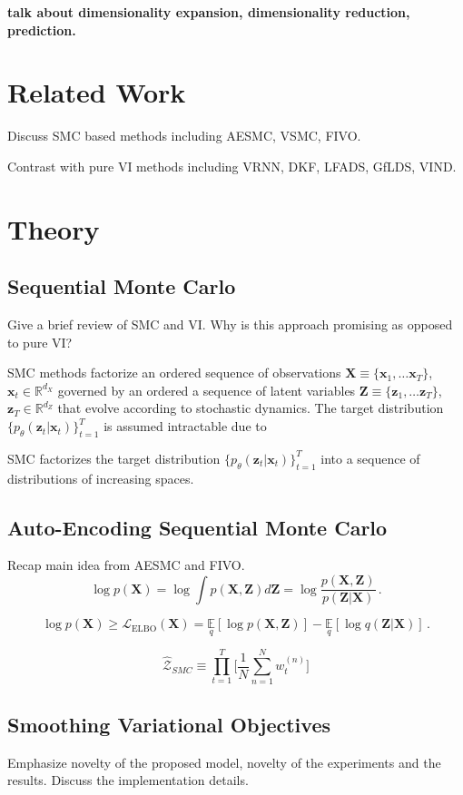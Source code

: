 \documentclass{article}
\newcommand{\be}{\begin{equation}}
\newcommand{\ee}{\end{equation}}
\newcommand{\trm}[1]{\textrm{#1}}
\newcommand{\mbf}[1]{\mathbf{#1}}
\newcommand{\mbb}[1]{\mathbb{#1}}
\newcommand{\msc}[1]{\mathscr{#1}}
\newcommand{\bx}{\mbf{x}}
\newcommand{\bX}{\mbf{X}}
\newcommand{\bZ}{\mbf{Z}}
\newcommand{\bz}{\mbf{z}}
\begin{document}
\textbf{talk about dimensionality expansion, dimensionality reduction, prediction.}

\section{Related Work}
Discuss SMC based methods including AESMC, VSMC, FIVO. 

Contrast with pure VI methods including VRNN, DKF, LFADS, GfLDS, VIND. 


\section{Theory}
\subsection{Sequential Monte Carlo}
Give a brief review of SMC and VI. Why is this approach promising as opposed to pure VI?

SMC methods factorize an ordered sequence of observations $\bX \equiv \{\bx_1,\dots\bx_T\}$, $\bx_t\in\mbb{R}^{d_X}$ governed by an ordered a sequence of latent variables $\bZ\equiv\{\bz_1,\dots\bz_T\}$, $\bz_T\in \mbb{R}^{d_Z}$ that evolve according to stochastic dynamics. The target distribution $\{p_{\theta}(\bz_t|\bx_t)\}_{t=1}^{T}$ is assumed intractable due to 

SMC factorizes the target distribution $\{p_{\theta}(\bz_t|\bx_t)\}_{t=1}^{T}$ into a sequence of distributions of increasing spaces. 


\subsection{Auto-Encoding Sequential Monte Carlo}
Recap main idea from AESMC and FIVO. 
\be
\log p(\bX) = \log \int p(\bX, \bZ) d\bZ = \log \frac{p(\bX, \bZ)}{p(\bZ|\bX)} \,. \label{ll}
\ee


\be
\log p(\bX) \geq \msc{L}_{\trm{ELBO}}(\bX) = \underset{q}{\mbb{E}}[\log p(\bX, \bZ)] - \underset{q}{\mbb{E}} [\log q(\bZ|\bX)] \label{ELBO} \,.
\ee


\be
\hat{\mathcal{Z}}_{SMC} \equiv \prod\limits_{t=1}^{T}\Big[\frac{1}{N}\sum\limits_{n=1}^{N}w_t^{(n)} \Big] 
\ee

\subsection{Smoothing Variational Objectives}
Emphasize novelty of the proposed model, novelty of the experiments and the results. Discuss the implementation details. 
\end{document}
